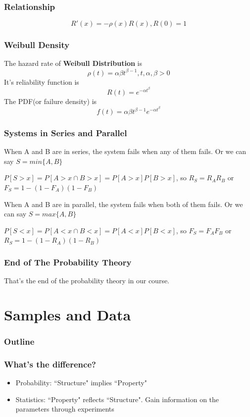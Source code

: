 \documentclass{beamer}
\begin{document}
\begin{frame}
    \frametitle{Relationship}
    \[R'(x)=-\rho(x)R(x), R(0)=1\]
    

\end{frame}

\begin{frame}
    \frametitle{Weibull Density}

    The hazard rate of \textbf{Weibull Distribution} is
    \[\rho(t)=\alpha\beta t^{\beta-1}, t,\alpha, \beta>0\]
    It's reliability function is
    \[R(t)=e^{-\alpha t^{\beta}}\]
    The PDF(or failure density) is 
    \[f(t)=\alpha\beta t^{\beta-1}e^{-\alpha t^{\beta}}\]

\end{frame}

\begin{frame}
    \frametitle{Systems in Series and Parallel}

    When A and B are in series, the system fails when any of them fails. Or we can say $S=min\{A,B\}$\par
    $P[S>x]=P[A>x \cap B>x]=P[A>x]P[B>x]$, so $R_{S}=R_{A}R_{B}$ or $F_S=1-(1-F_A)(1-F_B)$\par
    \vspace{0.3cm}
    When A and B are in parallel, the system fails when both of them fails. Or we can say $S=max\{A,B\}$\par
    $P[S<x]=P[A<x \cap B<x]=P[A<x]P[B<x]$, so $F_{S}=F_{A}F_{B}$ or $R_S=1-(1-R_A)(1-R_B)$\par

\end{frame}

\begin{frame}
    \frametitle{End of The Probability Theory}

    That's the end of the probability theory in our course.

\end{frame}

\section{Samples and Data}
\begin{frame}
    \frametitle{Outline}
    \tableofcontents[currentsection]
\end{frame}

\begin{frame}
    \frametitle{What's the difference?}
    \begin{itemize}
        \item Probability: ``Structure" implies ``Property"
        \item Statistics: ``Property" reflects ``Structure". Gain information on the parameters through experiments
    \end{itemize}


\end{frame}
\end{document}
